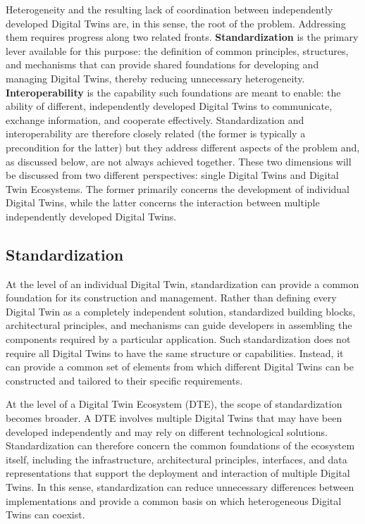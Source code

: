 Heterogeneity and the resulting lack of coordination between independently developed Digital Twins are, in this sense, the root of the problem. Addressing them requires progress along two related fronts. \textbf{Standardization} is the primary lever available for this purpose: the definition of common principles, structures, and mechanisms that can provide shared foundations for developing and managing Digital Twins, thereby reducing unnecessary heterogeneity. \textbf{Interoperability} is the capability such foundations are meant to enable: the ability of different, independently developed Digital Twins to communicate, exchange information, and cooperate effectively. Standardization and interoperability are therefore closely related (the former is typically a precondition for the latter) but they address different aspects of the problem and, as discussed below, are not always achieved together.
%
These two dimensions will be discussed from two different perspectives: single Digital Twins and Digital Twin Ecosystems. The former primarily concerns the development of individual Digital Twins, while the latter concerns the interaction between multiple independently developed Digital Twins.

\subsection{Standardization}

At the level of an individual Digital Twin, standardization can provide a common foundation for its construction and management. Rather than defining every Digital Twin as a completely independent solution, standardized building blocks, architectural principles, and mechanisms can guide developers in assembling the components required by a particular application. Such standardization does not require all Digital Twins to have the same structure or capabilities. Instead, it can provide a common set of elements from which different Digital Twins can be constructed and tailored to their specific requirements.

At the level of a Digital Twin Ecosystem (DTE), the scope of standardization becomes broader. A DTE involves multiple Digital Twins that may have been developed independently and may rely on different technological solutions. Standardization can therefore concern the common foundations of the ecosystem itself, including the infrastructure, architectural principles, interfaces, and data representations that support the deployment and interaction of multiple Digital Twins. In this sense, standardization can reduce unnecessary differences between implementations and provide a common basis on which heterogeneous Digital Twins can coexist.

